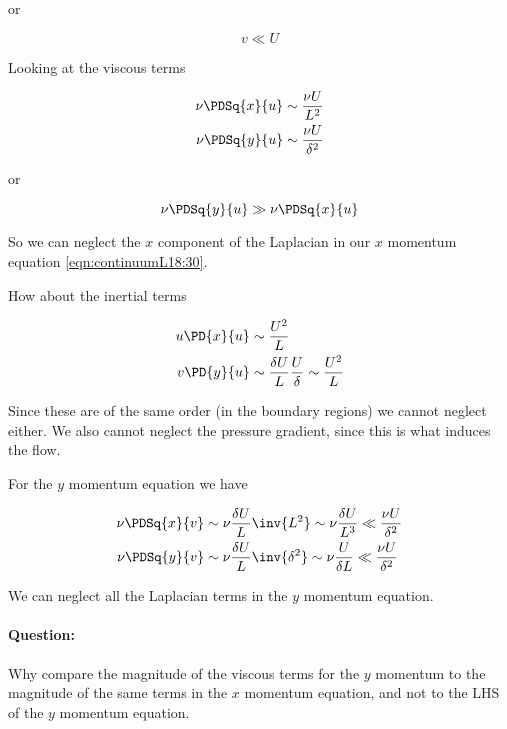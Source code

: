 or 

\begin{equation}\label{eqn:continuumL18:150}
v \ll U
\end{equation}

Looking at the viscous terms

\begin{align}\label{eqn:continuumL18:170}
\nu \PDSq{x}{u} &\sim \frac{\nu U}{L^2} \\
\nu \PDSq{y}{u} &\sim \frac{\nu U}{\delta^2}
\end{align}

or

\begin{equation}\label{eqn:continuumL18:190}
\nu \PDSq{y}{u} \gg \nu \PDSq{x}{u}
\end{equation}

So we can neglect the $x$ component of the Laplacian in our $x$ momentum equation \ref{eqn:continuumL18:30}.

How about the inertial terms

\begin{align}\label{eqn:continuumL18:210}
u \PD{x}{u} &\sim \frac{U^2}{L} \\
v \PD{y}{u} &\sim \frac{\delta U}{L} \frac{U}{\delta} \sim \frac{U^2}{L}
\end{align}

Since these are of the same order (in the boundary regions) we cannot neglect either.  We also cannot neglect the pressure gradient, since this is what induces the flow.

For the $y$ momentum equation we have

\begin{align}\label{eqn:continuumL18:230}
\nu \PDSq{x}{v} &\sim \nu \frac{\delta U}{L} \inv{L^2} \sim \nu \frac{\delta U}{L^3} \ll \frac{\nu U}{\delta^2} \\
\nu \PDSq{y}{v} &\sim \nu \frac{\delta U}{L} \inv{\delta^2} \sim \nu \frac{U}{\delta L} \ll \frac{\nu U}{\delta^2}
\end{align}

We can neglect all the Laplacian terms in the $y$ momentum equation.

\paragraph{Question:} Why compare the magnitude of the viscous terms for the $y$ momentum to the magnitude of the same terms in the $x$ momentum equation, and not to the LHS of the $y$ momentum equation.

